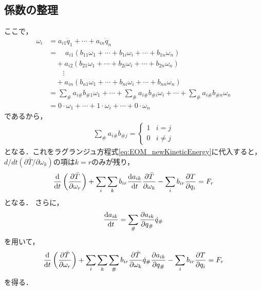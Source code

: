 \documentclass[a4j,10pt]{jsarticle}
\newcommand{\bbn}[2]{\frac{{\rm {\rm d}} #1}{{\rm {\rm d}} #2}}
\newcommand{\henbbn}[2]{\frac{\partial #1}{\partial #2}}
\begin{document}
\subsection*{係数の整理}
ここで，
\begin{align*}
    \omega_i   &= a_{i1}\dot{q}_1 + \cdots + a_{in}\dot{q}_n\\
                &=\quad  a_{i1}(b_{11}\omega_1+\cdots+b_{1i}\omega_i+\cdots+b_{1n}\omega_n)\\
                &\quad + a_{i2}(b_{21}\omega_1+\cdots+b_{2i}\omega_i+\cdots+b_{2n}\omega_n)\\
                &\quad\quad \vdots\\
                &\quad + a_{in}(b_{n1}\omega_1+\cdots+b_{ni}\omega_i+\cdots+b_{nn}\omega_n)\\
                &=\sum_\# a_{i\#}b_{\# 1}\omega_1 + \cdots + \sum_\# a_{i\#}b_{\# i}\omega_i + \cdots + \sum_\# a_{i\#}b_{\# n}\omega_n\\
                &=0\cdot\omega_1+\cdots+1\cdot\omega_i+\cdots+0\cdot\omega_n
\end{align*}
であるから，
\begin{align*}
    \sum_\# a_{i\#}b_{\# j}=\begin{cases}
    1 & i = j\\
    0 & i \neq j
    \end{cases}
\end{align*}
となる．これをラグランジュ方程式\eqref{eq:EOM_newKineticEnergy}に代入すると，$d/dt(\partial \bar{T}/\partial \omega_k)$の項は$k=r$のみが残り，
\begin{align}
    \bbn{}{t}\left(\henbbn{\bar{T}}{\omega_r}\right)+\sum_i\sum_k b_{ir}\bbn{a_{ik}}{t}\henbbn{\bar{T}}{\omega_k}-\sum_i b_{ir}\henbbn{T}{q_i}=F_r
\end{align}
となる．
さらに，
\begin{align*}
    \bbn{a_{ik}}{t} = \sum_\# \henbbn{a_{ik}}{q_\#}\dot{q}_\#
\end{align*}
を用いて，
\begin{align}
    \bbn{}{t}\left(\henbbn{\bar{T}}{\omega_r}\right)+\sum_i\sum_k\sum_\# b_{ir}\henbbn{\bar{T}}{\omega_k}\dot{q}_\# \henbbn{a_{ik}}{q_\#}-\sum_i b_{ir}\henbbn{T}{q_i}=F_r
    \label{eq:EOM_arrangedCoefficinets}
\end{align}
を得る．
\end{document}
